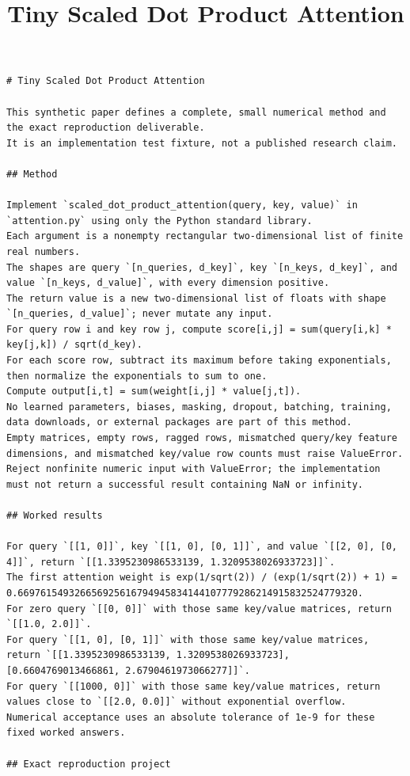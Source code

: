 \documentclass{article}
\begin{document}
\title{Tiny Scaled Dot Product Attention}
\maketitle
\begin{verbatim}
# Tiny Scaled Dot Product Attention

This synthetic paper defines a complete, small numerical method and the exact reproduction deliverable.
It is an implementation test fixture, not a published research claim.

## Method

Implement `scaled_dot_product_attention(query, key, value)` in `attention.py` using only the Python standard library.
Each argument is a nonempty rectangular two-dimensional list of finite real numbers.
The shapes are query `[n_queries, d_key]`, key `[n_keys, d_key]`, and value `[n_keys, d_value]`, with every dimension positive.
The return value is a new two-dimensional list of floats with shape `[n_queries, d_value]`; never mutate any input.
For query row i and key row j, compute score[i,j] = sum(query[i,k] * key[j,k]) / sqrt(d_key).
For each score row, subtract its maximum before taking exponentials, then normalize the exponentials to sum to one.
Compute output[i,t] = sum(weight[i,j] * value[j,t]).
No learned parameters, biases, masking, dropout, batching, training, data downloads, or external packages are part of this method.
Empty matrices, empty rows, ragged rows, mismatched query/key feature dimensions, and mismatched key/value row counts must raise ValueError.
Reject nonfinite numeric input with ValueError; the implementation must not return a successful result containing NaN or infinity.

## Worked results

For query `[[1, 0]]`, key `[[1, 0], [0, 1]]`, and value `[[2, 0], [0, 4]]`, return `[[1.3395230986533139, 1.3209538026933723]]`.
The first attention weight is exp(1/sqrt(2)) / (exp(1/sqrt(2)) + 1) = 0.669761549326656925616794945834144107779286214915832524779320.
For zero query `[[0, 0]]` with those same key/value matrices, return `[[1.0, 2.0]]`.
For query `[[1, 0], [0, 1]]` with those same key/value matrices, return `[[1.3395230986533139, 1.3209538026933723], [0.6604769013466861, 2.6790461973066277]]`.
For query `[[1000, 0]]` with those same key/value matrices, return values close to `[[2.0, 0.0]]` without exponential overflow.
Numerical acceptance uses an absolute tolerance of 1e-9 for these fixed worked answers.

## Exact reproduction project


\end{verbatim}
\end{document}

